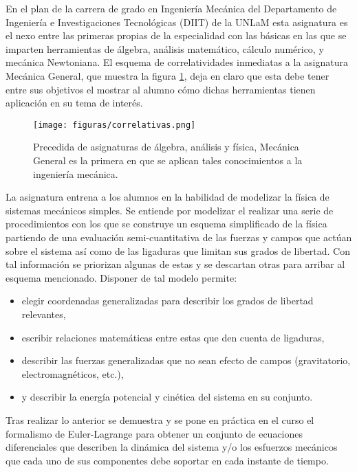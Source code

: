 En el plan de la carrera de grado en Ingeniería Mecánica del Departamento de Ingeniería e Investigaciones Tecnológicas (DIIT) de la UNLaM esta asignatura es el nexo entre las primeras propias de la especialidad con las básicas en las que se imparten herramientas de álgebra, análisis matemático, cálculo numérico, y mecánica Newtoniana. El esquema de correlatividades inmediatas a la asignatura Mecánica General, que muestra la figura \ref{fig:correlativas}, deja en claro que esta debe tener entre sus objetivos el mostrar al alumno cómo dichas herramientas tienen aplicación en su tema de interés.

\begin{figure}[!ht]
\centering
\texttt{[image: figuras/correlativas.png]}
\caption{Precedida de asignaturas de álgebra, análisis y física, Mecánica General es la primera en que se aplican tales conocimientos a la ingeniería mecánica.}
\label{fig:correlativas}
\end{figure}

La asignatura entrena a los alumnos en la habilidad de modelizar la física de sistemas mecánicos simples. Se entiende por modelizar el realizar una serie de procedimientos con los que se construye un esquema simplificado de la física partiendo de una evaluación semi-cuantitativa de las fuerzas y campos que actúan sobre el sistema así como de las ligaduras que limitan sus grados de libertad. Con tal información se priorizan algunas de estas y se descartan otras para arribar al esquema mencionado. Disponer de tal modelo permite:
\begin{itemize}
    \item elegir coordenadas generalizadas para describir los grados de libertad relevantes,
    \item escribir relaciones matemáticas entre estas que den cuenta de ligaduras,
    \item describir las fuerzas generalizadas que no sean efecto de campos (gravitatorio, electromagnéticos, etc.),
    \item y describir la energía potencial y cinética del sistema en su conjunto.
\end{itemize}

Tras realizar lo anterior se demuestra y se pone en práctica en el curso el formalismo de Euler-Lagrange para obtener un conjunto de ecuaciones diferenciales que describen la dinámica del sistema y/o los esfuerzos mecánicos que cada uno de sus componentes debe soportar en cada instante de tiempo.

